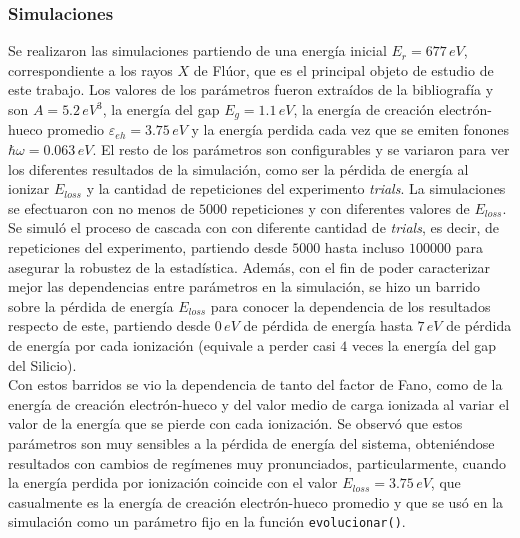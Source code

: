 \subsubsection*{Simulaciones}
\noindent Se realizaron las simulaciones partiendo de una energía inicial $E_{r} = 677\,\si{eV}$, correspondiente a los rayos $X$ de Flúor, que es el principal objeto de estudio de este trabajo. Los valores de los parámetros fueron extraídos de la bibliografía y son $A = 5.2\,\si{eV}^{3}$, la energía del gap $E_{g} = 1.1\,\si{eV}$, la energía de creación electrón-hueco promedio $\varepsilon_{eh} = 3.75\,\si{eV}$ y la energía perdida cada vez que se emiten fonones $\hbar \omega = 0.063\,\si{eV}$. El resto de los parámetros son configurables y se variaron para ver los diferentes resultados de la simulación, como ser la pérdida de energía al ionizar $E_{loss}$ y la cantidad de repeticiones del experimento \textit{trials}. La simulaciones se efectuaron con no menos de $5000$ repeticiones y con diferentes valores de $E_{loss}$.\\
\indent Se simuló el proceso de cascada con con diferente cantidad de \textit{trials}, es decir, de repeticiones del experimento, partiendo desde $5000$ hasta incluso $100000$ para asegurar la robustez de la estadística. Además, con el fin de poder caracterizar mejor las dependencias entre parámetros en la simulación, se hizo un barrido sobre la pérdida de energía $E_{loss}$ para conocer la dependencia de los resultados respecto de este, partiendo desde $0\,\si{eV}$ de pérdida de energía hasta $7\,\si{eV}$ de pérdida de energía por cada ionización (equivale a perder casi $4$ veces la energía del gap del Silicio).\\
\indent Con estos barridos se vio la dependencia de tanto del factor de Fano, como de la energía de creación electrón-hueco y del valor medio de carga ionizada al variar el valor de la energía que se pierde con cada ionización. Se observó que estos parámetros son muy sensibles a la pérdida de energía del sistema, obteniéndose resultados con cambios de regímenes muy pronunciados, particularmente, cuando la energía perdida por ionización coincide con el valor $E_{loss} = 3.75\,\si{eV}$, que casualmente es la energía de creación electrón-hueco promedio y que se usó en la simulación como un parámetro fijo en la función \verb|evolucionar()|.

